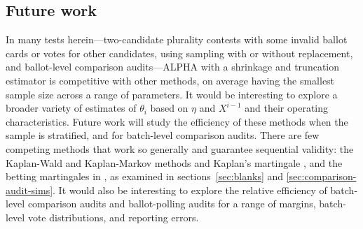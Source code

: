 \documentclass[12pt,runningheads]{llncs}
\begin{document}
{\subsection{Future work}
In many tests herein---two-candidate plurality contests with some invalid ballot cards or votes for other candidates, using
sampling with or without replacement, and ballot-level comparison audits---ALPHA with a shrinkage and truncation 
estimator is competitive with other methods, on average having the smallest sample size across a range of parameters.
It would be interesting
to explore a broader variety of estimates of $\theta_i$ based on $\eta$ and $X^{i-1}$ and their operating characteristics.
Future work will study the efficiency of these methods when the sample is stratified, and for batch-level comparison audits.
There are few competing methods that work so generally and guarantee sequential validity: the 
Kaplan-Wald and Kaplan-Markov methods and Kaplan's martingale \cite{stark09a,stark20},
and the betting martingales in \cite{waudby-smithEtal21}, as examined in sections~\ref{sec:blanks} and \ref{sec:comparison-audit-sims}.
It would also be interesting to explore the relative efficiency of batch-level comparison audits and ballot-polling audits for
a range of margins, batch-level vote distributions, and reporting errors.

}
\end{document}
